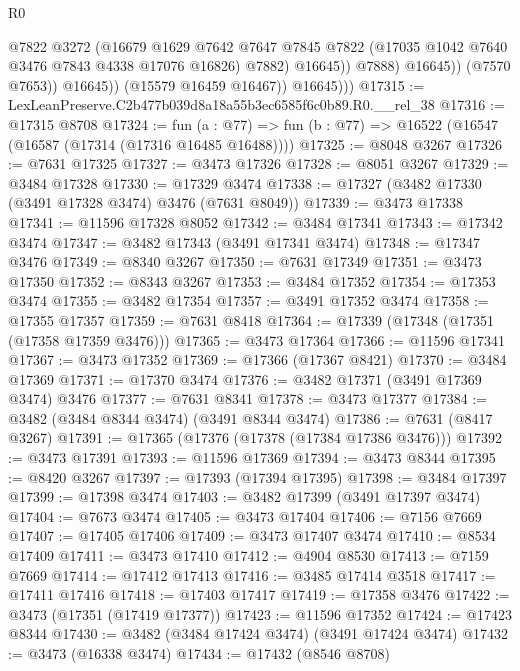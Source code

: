 \begin{lexlean}{R0}
\begin{coremodule}
                            @7822
                            @3272
                            (@16679
                              @1629
                              @7642
                              @7647
                              @7845
                              @7822
                              (@17035 @1042 @7640 @3476 @7843 @4338 @17076 @16826)
                              @7882)
                            @16645))
                        @7888)
                      @16645))
                  (@7570 @7653))
                @16645))
            (@15579 @16459 @16467))
          @16645)))
@17315 := LexLeanPreserve.C2b477b039d8a18a55b3ec6585f6c0b89.R0.__rel_38
@17316 := @17315 @8708
@17324 := fun (a : @77) => fun (b : @77) => @16522 (@16547 (@16587 (@17314 (@17316 @16485 @16488))))
@17325 := @8048 @3267
@17326 := @7631 @17325
@17327 := @3473 @17326
@17328 := @8051 @3267
@17329 := @3484 @17328
@17330 := @17329 @3474
@17338 := @17327 (@3482 @17330 (@3491 @17328 @3474) @3476 (@7631 @8049))
@17339 := @3473 @17338
@17341 := @11596 @17328 @8052
@17342 := @3484 @17341
@17343 := @17342 @3474
@17347 := @3482 @17343 (@3491 @17341 @3474)
@17348 := @17347 @3476
@17349 := @8340 @3267
@17350 := @7631 @17349
@17351 := @3473 @17350
@17352 := @8343 @3267
@17353 := @3484 @17352
@17354 := @17353 @3474
@17355 := @3482 @17354
@17357 := @3491 @17352 @3474
@17358 := @17355 @17357
@17359 := @7631 @8418
@17364 := @17339 (@17348 (@17351 (@17358 @17359 @3476)))
@17365 := @3473 @17364
@17366 := @11596 @17341
@17367 := @3473 @17352
@17369 := @17366 (@17367 @8421)
@17370 := @3484 @17369
@17371 := @17370 @3474
@17376 := @3482 @17371 (@3491 @17369 @3474) @3476
@17377 := @7631 @8341
@17378 := @3473 @17377
@17384 := @3482 (@3484 @8344 @3474) (@3491 @8344 @3474)
@17386 := @7631 (@8417 @3267)
@17391 := @17365 (@17376 (@17378 (@17384 @17386 @3476)))
@17392 := @3473 @17391
@17393 := @11596 @17369
@17394 := @3473 @8344
@17395 := @8420 @3267
@17397 := @17393 (@17394 @17395)
@17398 := @3484 @17397
@17399 := @17398 @3474
@17403 := @3482 @17399 (@3491 @17397 @3474)
@17404 := @7673 @3474
@17405 := @3473 @17404
@17406 := @7156 @7669
@17407 := @17405 @17406
@17409 := @3473 @17407 @3474
@17410 := @8534 @17409
@17411 := @3473 @17410
@17412 := @4904 @8530
@17413 := @7159 @7669
@17414 := @17412 @17413
@17416 := @3485 @17414 @3518
@17417 := @17411 @17416
@17418 := @17403 @17417
@17419 := @17358 @3476
@17422 := @3473 (@17351 (@17419 @17377))
@17423 := @11596 @17352
@17424 := @17423 @8344
@17430 := @3482 (@3484 @17424 @3474) (@3491 @17424 @3474)
@17432 := @3473 (@16338 @3474)
@17434 := @17432 (@8546 @8708)

\end{coremodule}
\end{lexlean}
